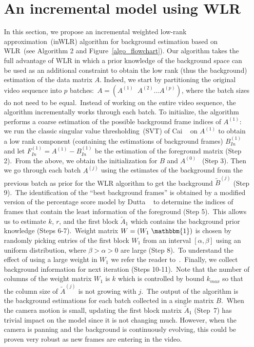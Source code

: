 \documentclass[10pt,twocolumn,letterpaper]{article}
\begin{document}
\section{An incremental model using WLR}
\vspace{-0.0in}
In this section, we propose an incremental weighted
low-rank approximation~(inWLR) algorithm for background estimation
based on WLR~(see Algorithm 2 and Figure~\ref{algo_flowchart}). Our
algorithm takes the full advantage of WLR in which a prior knowledge
of the background space can be used as an additional constraint to
obtain the low rank (thus the background) estimation of the data
matrix $A$. Indeed, we start by partitioning the original video
sequence into $p$ batches:~$A=(A^{(1)}\;\;A^{(2)}\ldots A^{(p)})$,
where the batch sizes do not need to be equal.~Instead of working on
the entire video sequence, the algorithm incrementally works through
each batch. To initialize, the algorithm performs a coarse
estimation of the possible background frame indices of $A^{(1)}$: we
run the classic singular value thresholding~(SVT) of Cai
\etal~\cite{caicandesshen} on $A^{(1)}$ to obtain a low rank
component (containing the estimations of background frames)
$B^{(1)}_{In}$ and let $F^{(1)}_{In}=A^{(1)}-B^{(1)}_{In}$ be the
estimation of the foreground matrix (Step 2).~From the above, we
obtain the initialization for $B$ and $A^{(0)}$ ~(Step 3). Then we
go through each batch $A^{(j)}$ using the estimates of the
background from the previous batch as prior for the WLR algorithm to
get the background $\tilde{B}^{(j)}$ (Step 9).~The identification of
the ``best background frames'' is obtained by a modified version of
the percentage score model by Dutta \etal~\cite{duttaligongshah} to
determine the indices of frames that contain the least information of
the foreground (Step 5).~This allows us to estimate $k$, $r$, and
the first block $\tilde{A}_1$ which contains the background prior
knowledge (Steps 6-7).~Weight matrix $W= (W_1\;\mathbbm{1})$ is
chosen by randomly picking entries of the first block $W_1$ from an
interval $[\alpha, \beta]$ using an uniform distribution, where
$\beta>\alpha>0$ are large (Step 8).~To understand the effect of
using a large weight in $W_1$ we refer the reader
to~\cite{duttali_acl,duttali}.~Finally, we collect background
information for next iteration (Steps 10-11).~Note that the number
of columns of the weight matrix $W_1$ is $k$ which is controlled by
bound $k_{max}$ so that the column size of $\tilde{A}^{(j)}$ is not
growing with $j$.~The output of the algorithm is the background
estimations for each batch collected in a single matrix $B$.~When
the camera motion is small, updating the first block matrix
$\tilde{A}_1$ (Step~7) has trivial impact on the model since it is
not changing much. However, when the camera is panning and the
background is continuously evolving, this could be proven very
robust as new frames are entering in the video.
\end{document}
